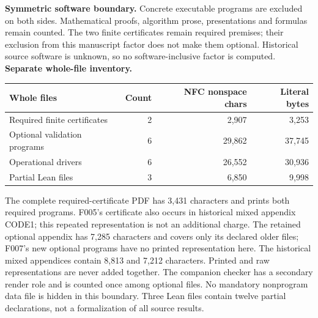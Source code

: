 \documentclass[11pt,a4paper]{article}
\begin{document}
\textbf{Symmetric software boundary.} Concrete executable programs are excluded on both sides. Mathematical proofs, algorithm prose, presentations and formulas remain counted. The two finite certificates remain required premises; their exclusion from this manuscript factor does not make them optional. Historical source software is unknown, so no software-inclusive factor is computed.
\newpage
\textbf{Separate whole-file inventory.}
\begin{center}\small\begin{tabular}{lrrr}\toprule
Whole files & Count & NFC nonspace chars & Literal bytes\\\midrule
Required finite certificates & 2 & 2,907 & 3,253\\
Optional validation programs & 6 & 29,862 & 37,745\\
Operational drivers & 6 & 26,552 & 30,936\\
Partial Lean files & 3 & 6,850 & 9,998\\
\bottomrule\end{tabular}\end{center}
The complete required-certificate PDF has 3,431 characters and prints both required programs. F005's certificate also occurs in historical mixed appendix CODE1; this repeated representation is not an additional charge. The retained optional appendix has 7,285 characters and covers only its declared older files; F007's new optional programs have no printed representation here. The historical mixed appendices contain 8,813 and 7,212 characters. Printed and raw representations are never added together. The companion checker has a secondary render role and is counted once among optional files. No mandatory nonprogram data file is hidden in this boundary. Three Lean files contain twelve partial declarations, not a formalization of all source results.
\end{document}

